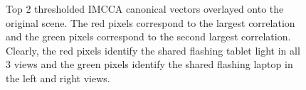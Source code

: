\begin{figure}
  \begin{center}
    \caption{Top 2 thresholded IMCCA canonical vectors overlayed onto the original
      scene. The red pixels correspond to the largest correlation and the green pixels
      correspond to the second largest correlation. Clearly, the red pixels identify the
      shared flashing tablet light in all 3 views and the green pixels identify the shared
      flashing laptop in the left and right views.}
    \label{fig:chpt10:mcca_icca_vects}
  \end{center}
\end{figure}


